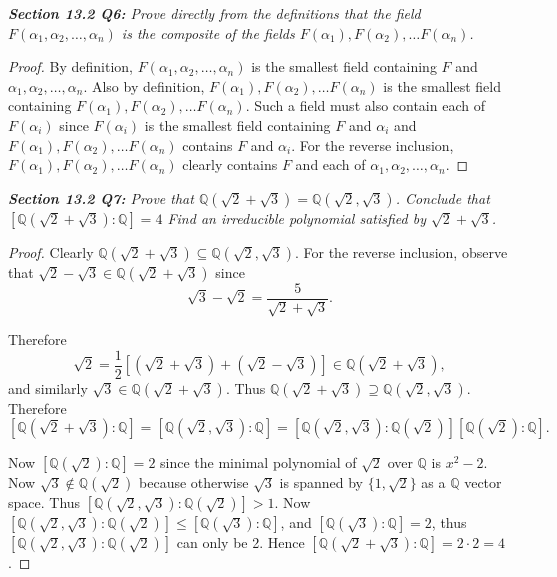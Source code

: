 \documentclass{article}
\begin{document}
\it \textbf{Section 13.2 Q6:} Prove directly from the definitions that the
  field $F(\alpha_1,\alpha_2,\ldots,\alpha_n)$ is the composite of the
  fields $F(\alpha_1),F(\alpha_2),\ldots F(\alpha_n)$.

  \begin{proof}
    By definition, $F(\alpha_1,\alpha_2,\ldots,\alpha_n)$ is the smallest
    field containing $F$ and $\alpha_1,\alpha_2,\ldots,\alpha_n$. Also by
    definition, $F(\alpha_1),F(\alpha_2),\ldots F(\alpha_n)$ is the
    smallest field containing $F(\alpha_1),F(\alpha_2),\ldots F(\alpha_n)$.
    Such a field must also contain each of $F(\alpha_i)$ since
    $F(\alpha_i)$ is the smallest field containing $F$ and $\alpha_i$ and
    $F(\alpha_1),F(\alpha_2),\ldots F(\alpha_n)$ contains $F$ and
    $\alpha_i$. For the reverse inclusion, $F(\alpha_1),F(\alpha_2),\ldots
    F(\alpha_n)$ clearly contains $F$ and each of
    $\alpha_1,\alpha_2,\ldots,\alpha_n$.
  \end{proof}

\it \textbf{Section 13.2 Q7:} Prove that $\mathbb{Q}(\sqrt{2}+\sqrt{3})
  =\mathbb{Q}(\sqrt{2},\sqrt{3})$. Conclude that
  $[\mathbb{Q}(\sqrt{2}+\sqrt{3}):\mathbb{Q}]=4$ Find an irreducible
  polynomial satisfied by $\sqrt{2}+\sqrt{3}$.

  \begin{proof}
    Clearly $\mathbb{Q}(\sqrt{2}+\sqrt{3})
    \subseteq\mathbb{Q}(\sqrt{2},\sqrt{3})$. For the reverse inclusion,
    observe that $\sqrt{2}-\sqrt{3} \in\mathbb{Q}(\sqrt{2}+\sqrt{3})$ since
    \[\sqrt{3}-\sqrt{2} =\frac{5}{\sqrt{2}+\sqrt{3}}.\]

    Therefore
    \[\sqrt{2} =\frac{1}{2} [(\sqrt{2}+\sqrt{3}) +(\sqrt{2}-\sqrt{3})]
    \in\mathbb{Q}(\sqrt{2}+\sqrt{3}),\]
    and similarly $\sqrt{3} \in\mathbb{Q}(\sqrt{2}+\sqrt{3})$. Thus
    $\mathbb{Q}(\sqrt{2}+\sqrt{3}) \supseteq\mathbb{Q}(\sqrt{2},\sqrt{3})$.
    \\

    Therefore
    \[[\mathbb{Q}(\sqrt{2}+\sqrt{3}):\mathbb{Q}]
    =[\mathbb{Q}(\sqrt{2},\sqrt{3}):\mathbb{Q}]
    =[\mathbb{Q}(\sqrt{2},\sqrt{3}):\mathbb{Q}(\sqrt{2})]
    [\mathbb{Q}(\sqrt{2}):\mathbb{Q}].\]

    Now $[\mathbb{Q}(\sqrt{2}):\mathbb{Q}]=2$ since the minimal polynomial
    of $\sqrt{2}$ over $\mathbb{Q}$ is $x^2-2$. Now
    $\sqrt{3}\not\in\mathbb{Q}(\sqrt{2})$ because otherwise $\sqrt{3}$ is
    spanned by $\{1,\sqrt{2}\}$ as a $\mathbb{Q}$ vector space. Thus
    $[\mathbb{Q}(\sqrt{2},\sqrt{3}):\mathbb{Q}(\sqrt{2})] >1$. Now
    $[\mathbb{Q}(\sqrt{2},\sqrt{3}):\mathbb{Q}(\sqrt{2})]
    \leq[\mathbb{Q}(\sqrt{3}):\mathbb{Q}]$, and
    $[\mathbb{Q}(\sqrt{3}):\mathbb{Q}]=2$, thus
    $[\mathbb{Q}(\sqrt{2},\sqrt{3}):\mathbb{Q}(\sqrt{2})]$ can only be 2.
    Hence $[\mathbb{Q}(\sqrt{2}+\sqrt{3}):\mathbb{Q}]=2\cdot2=4$.
  \end{proof}
\end{document}
